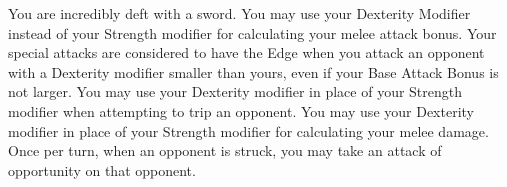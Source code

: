 {You are incredibly deft with a sword.}
{You may use your Dexterity Modifier instead of your Strength modifier for calculating your melee attack bonus.}
{Your special attacks are considered to have the Edge when you attack an opponent with a Dexterity modifier smaller than yours, even if your Base Attack Bonus is not larger.}
{You may use your Dexterity modifier in place of your Strength modifier when attempting to trip an opponent.}
{You may use your Dexterity modifier in place of your Strength modifier for calculating your melee damage.}
{Once per turn, when an opponent is struck, you may take an attack of opportunity on that opponent.}